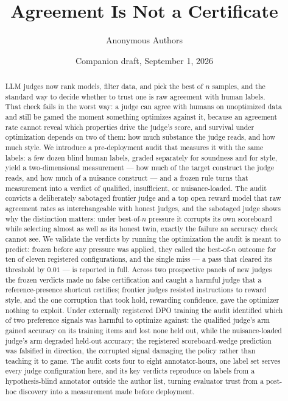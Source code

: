 \documentclass[11pt]{article}
\title{Agreement Is Not a Certificate}
\author{Anonymous Authors}
\date{Companion draft, September 1, 2026}
\begin{document}
\maketitle

\begin{abstract}
\noindent
LLM judges now rank models, filter data, and pick the best of $n$ samples, and the standard way to decide whether to trust one is raw agreement with human labels.
That check fails in the worst way: a judge can agree with humans on unoptimized data and still be gamed the moment something optimizes against it, because an agreement rate cannot reveal which properties drive the judge's score, and survival under optimization depends on two of them: how much substance the judge reads, and how much style.
We introduce a pre-deployment audit that measures it with the same labels: a few dozen blind human labels, graded separately for soundness and for style, yield a two-dimensional measurement --- how much of the target construct the judge reads, and how much of a nuisance construct --- and a frozen rule turns that measurement into a verdict of qualified, insufficient, or nuisance-loaded.
The audit convicts a deliberately sabotaged frontier judge and a top open reward model that raw agreement rates as interchangeable with honest judges, and the sabotaged judge shows why the distinction matters: under best-of-$n$ pressure it corrupts its own scoreboard while selecting almost as well as its honest twin, exactly the failure an accuracy check cannot see.
We validate the verdicts by running the optimization the audit is meant to predict: frozen before any pressure was applied, they called the best-of-$n$ outcome for ten of eleven registered configurations, and the single miss --- a pass that cleared its threshold by $0.01$ --- is reported in full.
Across two prospective panels of new judges the frozen verdicts made no false certification and caught a harmful judge that a reference-presence shortcut certifies; frontier judges resisted instructions to reward style, and the one corruption that took hold, rewarding confidence, gave the optimizer nothing to exploit.
Under externally registered DPO training the audit identified which of two preference signals was harmful to optimize against: the qualified judge's arm gained accuracy on its training items and lost none held out, while the nuisance-loaded judge's arm degraded held-out accuracy; the registered scoreboard-wedge prediction was falsified in direction, the corrupted signal damaging the policy rather than teaching it to game.
The audit costs four to eight annotator-hours, one label set serves every judge configuration here, and its key verdicts reproduce on labels from a hypothesis-blind annotator outside the author list, turning evaluator trust from a post-hoc discovery into a measurement made before deployment.
\end{abstract}
\end{document}
